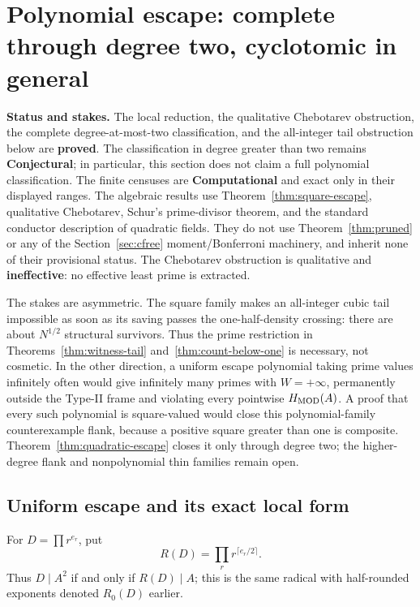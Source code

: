 \documentclass[10pt,reqno]{amsart}
\theoremstyle{definition}
\newcommand{\1}{\mathbf 1}
\begin{document}
\section{Polynomial escape: complete through degree two, cyclotomic in general}
\label{sec:polynomial-escape}
\medskip\noindent\textbf{Status and stakes.}
The local reduction, the qualitative Chebotarev obstruction, the complete
degree-at-most-two classification, and the all-integer tail obstruction below
are \textbf{proved}.  The classification in degree greater than two remains
\textbf{Conjectural}; in particular, this section does not claim a full
polynomial classification.  The finite censuses are \textbf{Computational}
and exact only in their displayed ranges.  The algebraic results use
Theorem~\ref{thm:square-escape}, qualitative Chebotarev, Schur's prime-divisor
theorem, and the standard conductor description of quadratic fields.  They
do not use Theorem~\ref{thm:pruned} or any of the Section~\ref{sec:cfree}
moment/Bonferroni machinery, and inherit none of their provisional status.
The Chebotarev obstruction is qualitative and \textbf{ineffective}: no
effective least prime is extracted.

The stakes are asymmetric.  The square family makes an all-integer cubic
tail impossible as soon as its saving passes the one-half-density crossing:
there are about $N^{1/2}$ structural survivors.  Thus the prime restriction
in Theorems~\ref{thm:witness-tail} and~\ref{thm:count-below-one} is necessary,
not cosmetic.  In the other direction, a uniform escape polynomial taking
prime values infinitely often would give infinitely many primes with
$W=+\infty$, permanently outside the Type-II frame and violating every
pointwise $H_{\rm MOD}(A)$.  A proof that every such polynomial is
square-valued would close this polynomial-family counterexample flank,
because a positive square greater than one is composite.
Theorem~\ref{thm:quadratic-escape} closes it only through degree two; the
higher-degree flank and nonpolynomial thin families remain open.

\subsection{Uniform escape and its exact local form}
For $D=\prod r^{e_r}$, put
\begin{equation}\tag{59.1}
             R(D)=\prod_r r^{\lceil e_r/2\rceil}.
\end{equation}
Thus $D\mid A^2$ if and only if $R(D)\mid A$; this is the same radical
with half-rounded exponents denoted $R_0(D)$ earlier.
\end{document}
